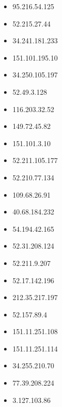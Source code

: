 \documentclass{article}
\begin{document}
\begin{itemize}
        \item 95.216.54.125
    
        \item 52.215.27.44
    
        \item 34.241.181.233
    
        \item 151.101.195.10
    
        \item 34.250.105.197
    
        \item 52.49.3.128
    
        \item 116.203.32.52
    
        \item 149.72.45.82
    
        \item 151.101.3.10
    
        \item 52.211.105.177
    
        \item 52.210.77.134
    
        \item 109.68.26.91
    
        \item 40.68.184.232
    
        \item 54.194.42.165
    
        \item 52.31.208.124
    
        \item 52.211.9.207
    
        \item 52.17.142.196
    
        \item 212.35.217.197
    
        \item 52.157.89.4
    
        \item 151.11.251.108
    
        \item 151.11.251.114
    
        \item 34.255.210.70
    
        \item 77.39.208.224
    
        \item 3.127.103.86
    

\end{itemize}
\end{document}
